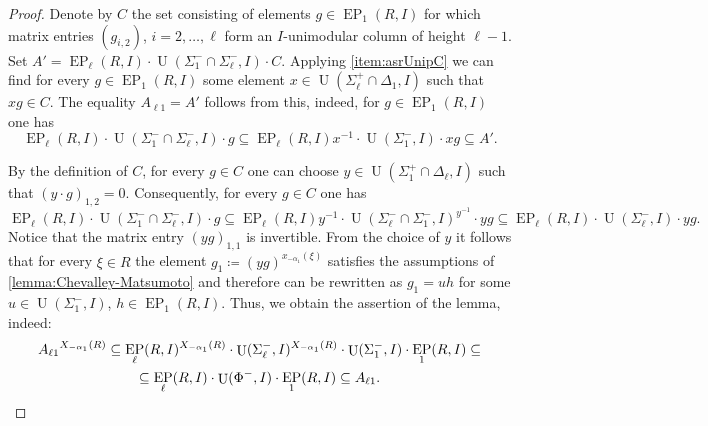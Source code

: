\documentclass[11pt]{amsart}
\theoremstyle{plain}
\numberwithin{equation}{section}
\numberwithin{lemma}{section}
\theoremstyle{definition}
\theoremstyle{remark}
\DeclareMathOperator{\EP}{EP}
\DeclareMathOperator{\U}{U}
\begin{document}
\begin{proof}
Denote by $C$ the set consisting of elements $g \in \EP_1(R, I)$ for which matrix entries $(g_{i, 2})$, $i=2, \ldots, \ell$ form an $I$-unimodular column of height $\ell-1$.
Set $A' = \EP_\ell(R, I) \cdot \U(\Sigma_1^- \cap \Sigma_\ell^-, I) \cdot C$.
Applying \cref{item:asrUnipC} we can find for every $g \in \EP_1(R, I)$ some element $x \in \U(\Sigma_\ell^+ \cap \Delta_1, I)$ such that $xg \in C$.  
The equality $A_{\ell 1} = A'$ follows from this, indeed, for $g\in \EP_1(R, I)$ one has
\begin{equation*} \EP_\ell(R, I) \cdot \U(\Sigma_1^- \cap \Sigma_\ell^-, I) \cdot g \subseteq 
 \EP_\ell(R, I)x^{-1}  \cdot \U(\Sigma_1^-, I) \cdot xg \subseteq A'. \end{equation*}

By the definition of $C$, for every $g \in C$ one can choose $y \in \U(\Sigma_1^+ \cap \Delta_\ell, I)$ such that $(y \cdot g)_{1, 2} = 0$.
Consequently, for every $g\in C$ one has
\[
 \EP_\ell(R, I) \cdot \U(\Sigma_1^- \cap \Sigma_\ell^-, I) \cdot g \subseteq \EP_\ell(R, I) y^{-1} \cdot \U(\Sigma_\ell^-\cap \Sigma_1^-, I)^{y^{-1}} \cdot y g
  \subseteq \EP_\ell(R, I) \cdot \U(\Sigma_\ell^-, I) \cdot y g.
\]
Notice that the matrix entry $(yg)_{1, 1}$ is invertible.
From the choice of $y$ it follows that for every $\xi\in R$ the element $g_1 \coloneqq (yg)^{x_{-\alpha_1}(\xi)}$
satisfies the assumptions of \cref{lemma:Chevalley-Matsumoto} and therefore can be rewritten as $g_1 = uh$ for some $u \in \U(\Sigma_1^-, I)$, $h \in \EP_1(R, I)$.
Thus, we obtain the assertion of the lemma, indeed:
\begin{multline*} {A_{\ell 1}}^{X_{-\alpha_{1}}(R)} \subseteq \EP_\ell(R, I)^{X_{-\alpha_1}(R)} \cdot \U(\Sigma_\ell^-, I)^{X_{-\alpha_1}(R)} \cdot \U(\Sigma_1^-, I) \cdot \EP_1(R, I) \subseteq \\
\subseteq \EP_\ell(R, I) \cdot \U(\Phi^-, I) \cdot \EP_1(R, I) \subseteq A_{\ell 1}. \qedhere \end{multline*}
\end{proof}
\end{document}
